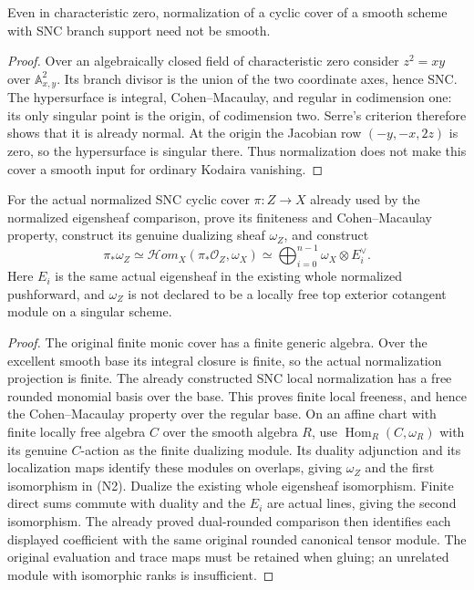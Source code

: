 \begin{lemma}
\label{lem:kn-nadel-normalization-warning}
\notready
Even in characteristic zero, normalization of a cyclic cover of a
smooth scheme with SNC branch support need not be smooth.
\end{lemma}
\begin{proof}
Over an algebraically closed field of characteristic zero consider
$z^2=xy$ over $\mathbb A^2_{x,y}$.  Its branch divisor is the union of
the two coordinate axes, hence SNC.  The hypersurface is integral,
Cohen--Macaulay, and regular in codimension one: its only singular point
is the origin, of codimension two.  Serre's criterion therefore shows
that it is already normal.  At the origin the Jacobian row
$(-y,-x,2z)$ is zero, so the hypersurface is singular there.  Thus
normalization does not make this cover a smooth input for ordinary
Kodaira vanishing.
\end{proof}

\begin{lemma}
\label{lem:kn-nadel-normalized-canonical-duality}
\notready
For the actual normalized SNC cyclic cover $\pi:Z\to X$ already used
by the normalized eigensheaf comparison, prove its finiteness and
Cohen--Macaulay property, construct its genuine dualizing sheaf
$\omega_Z$, and construct
\[
 \pi_*\omega_Z\simeq
 \mathcal Hom_X(\pi_*\mathcal O_Z,\omega_X)
 \simeq\bigoplus_{i=0}^{n-1}\omega_X\otimes E_i^\vee.
 \tag{N2}
\]
Here $E_i$ is the same actual eigensheaf in the existing whole
normalized pushforward, and $\omega_Z$ is not declared to be a locally
free top exterior cotangent module on a singular scheme.
\end{lemma}
\begin{proof}
The original finite monic cover has a finite generic algebra.  Over the
excellent smooth base its integral closure is finite, so the actual
normalization projection is finite.  The already constructed SNC local
normalization has a free rounded monomial basis over the base.  This
proves finite local freeness, and hence the Cohen--Macaulay property
over the regular base.  On an affine chart with finite locally free
algebra $C$ over the smooth algebra $R$, use
$\operatorname{Hom}_R(C,\omega_R)$ with its genuine $C$-action as the
finite dualizing module.  Its duality adjunction and its localization
maps identify these modules on overlaps, giving $\omega_Z$ and the
first isomorphism in (N2).  Dualize the existing whole eigensheaf
isomorphism.  Finite direct sums commute with duality and the $E_i$
are actual lines, giving the second isomorphism.  The already proved
dual-rounded comparison then identifies each displayed coefficient
with the same original rounded canonical tensor module.  The original
evaluation and trace maps must be retained when gluing; an unrelated
module with isomorphic ranks is insufficient.
\end{proof}

